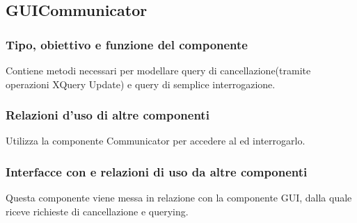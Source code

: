 \documentclass[11pt,titlepage,a4paper]{report}
\begin{document}
\subsection{GUICommunicator}
\subsubsection{Tipo, obiettivo e funzione del componente}
Contiene metodi necessari per modellare query di cancellazione(tramite operazioni XQuery Update) e query di semplice interrogazione.
\subsubsection{Relazioni d'uso di altre componenti}
Utilizza la componente Communicator per accedere al \re ed interrogarlo.
\subsubsection{Interfacce con e relazioni di uso da altre componenti}
Questa componente viene messa in relazione con la componente GUI, dalla quale riceve richieste di cancellazione e querying.%
\end{document}
